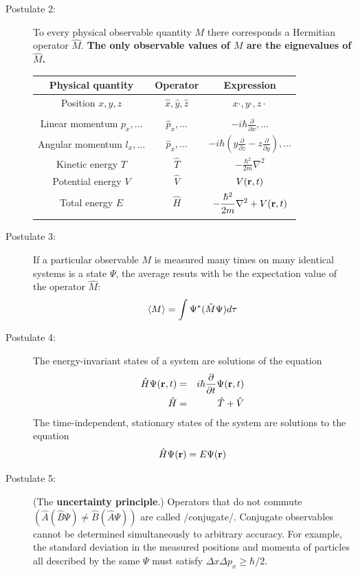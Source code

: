 \documentclass[11pt]{article}
\begin{document}
\begin{table}
\begin{center}
\begin{description}
  \item[Postulate 2:]  To every physical observable quantity $M$ there corresponds a
    Hermitian operator $\hat{M}$.  {\bf The only observable values of $M$ are the
      eignevalues of $\hat{M}$.}
    \begin{center}
    \begin{tabular}[h]{ccc}
      \hline
{\bf Physical quantity} & {\bf Operator} & {\bf Expression} \\
\hline
Position $x,y,z$ & $\hat{x},\hat{y},\hat{z}$ & $x\cdot, y\cdot, z\cdot$ \\ \\
Linear momentum $p_x, \ldots$ & $\hat{p}_x,\ldots $ & $\displaystyle -i\hbar\frac{\partial}{\partial
  x},\ldots $\\
Angular momentum $l_x, \ldots$ & $\hat{p}_x,\ldots $ & $\displaystyle -i\hbar \left
  (y\frac{\partial}{\partial z}-z\frac{\partial}{\partial y}\right ), \ldots $ \\
Kinetic energy $T$ & $\hat{T}$ & $\displaystyle -\frac{\hbar^2}{2m}\nabla^2$ \\
Potential energy $V$ & $\hat{V}$ & $V({\bf r},t)$ \\
Total energy $E$ & $\hat{H}$ & $\displaystyle -\frac{\hbar^2}{2m}\nabla^2+V({\bf r},t)$\\ \\
\hline
    \end{tabular}
  \end{center}
    \item[Postulate 3:] {If a particular observable $M$ is measured many times on many
      identical systems is a state $\Psi$, the average resuts with be the expectation
      value of the operator $\hat{M}$:
      \begin{equation*}
        \langle M \rangle = \int \Psi^* (\hat{M}\Psi)d{\bf\tau}
      \end{equation*}}
    \item[Postulate 4:] {The energy-invariant states of a system are solutions of the equation
        \begin{eqnarray*}
          \hat{H}\Psi({\bf r},t) & = & i\hbar\frac{\partial}{\partial t}\Psi({\bf r},t) \\
          \hat{H} & = & \hat{T}+\hat{V}
        \end{eqnarray*}
      The time-independent, stationary states of the system are solutions to the equation
      \begin{equation*}
        \hat{H}\Psi({\bf r}) = E\Psi(\bf{r})
      \end{equation*}
}
    \item[Postulate 5:] (The {\bf uncertainty principle}.)  Operators that do not commute
      $(\hat{A}(\hat{B}\Psi)\neq\hat{B}(\hat{A}\Psi))$ are called /conjugate/.
      Conjugate observables cannot be determined simultaneously to arbitrary accuracy.
      For example, the standard deviation in the measured positions and momenta of
      particles all described by the same $\Psi$ must satisfy $\Delta x\Delta p_x \geq \hbar/2$.
    \end{description}
\end{center}
\end{table}
\end{document}
